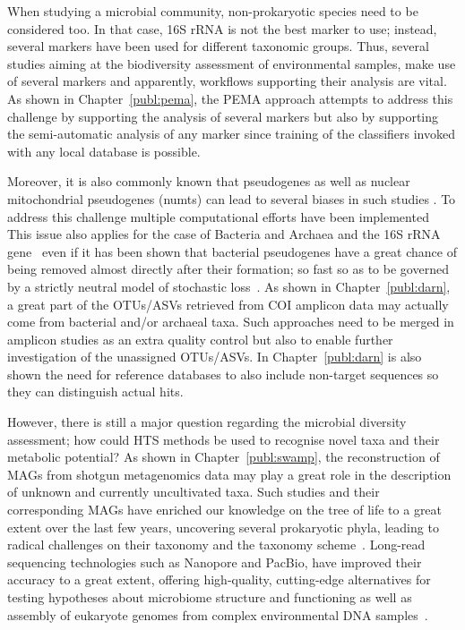    When studying a microbial community, non-prokaryotic species need to be considered too. 
   In that case, 16S rRNA is not the best marker to use; instead, several markers 
   have been used for different taxonomic groups. 
   Thus, several studies aiming at the biodiversity assessment of environmental samples, 
   make use of several markers and apparently, workflows supporting their analysis are vital. 
   As shown in Chapter~\ref{publ:pema}, the PEMA approach attempts to address this challenge 
   by supporting the analysis of several markers but also by
   supporting the semi-automatic analysis of any marker since training of the classifiers invoked
   with any local database is possible. 

   Moreover, it is also commonly known that pseudogenes as well as 
   nuclear mitochondrial pseudogenes (numts) can lead to several biases in such studies \citep{song2008many}.
   To address this challenge multiple computational efforts have been implemented~\citep{porter2021profile}
   This issue also applies for the case of Bacteria and Archaea and the 16S rRNA gene~\citep{pei2010diversity}
   even if it has been shown that bacterial pseudogenes have a great chance of being removed almost directly after their formation;
   so fast so as to be governed by a strictly neutral model of stochastic loss~\citep{kuo2010extinction}.
   As shown in Chapter~\ref{publ:darn}, a great part of the OTUs/ASVs retrieved from COI amplicon data
   may actually come from bacterial and/or archaeal taxa.
   Such approaches need to be merged in amplicon studies as an extra
   quality control but also to enable further investigation of the unassigned OTUs/ASVs. 
   In Chapter~\ref{publ:darn} is also shown the need for reference databases to also include non-target sequences 
   so they can distinguish actual hits. 

   However, there is still a major question regarding the microbial diversity assessment; 
   how could HTS methods be used to recognise novel taxa and their metabolic potential? 
   As shown in Chapter~\ref{publ:swamp}, the reconstruction of MAGs from shotgun metagenomics data
   may play a great role in the description of unknown and currently uncultivated taxa. 
   Such studies and their corresponding MAGs have enriched our knowledge on the tree of life to a great extent 
   over the last few years, uncovering several prokaryotic phyla, leading to 
   radical challenges on their taxonomy and the taxonomy scheme~\citep{parks_gtdb_2022}.
   Long-read sequencing technologies such as Nanopore and PacBio, have improved their accuracy to a great extent,
   offering high-quality, cutting-edge alternatives for testing hypotheses about microbiome structure 
   and functioning as well as assembly of eukaryote genomes from complex environmental DNA samples~\citep{tedersoo2021perspectives}.

